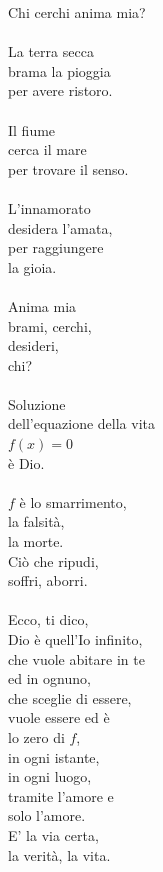 \begin{haiku}
Chi cerchi anima mia?\\

    \leavevmode\\

La terra secca\\
brama la pioggia\\
per avere ristoro.\\

\leavevmode\\

Il fiume\\
cerca il mare\\
per trovare il senso.\\

\leavevmode\\

L'innamorato\\
desidera l'amata,\\
per raggiungere\\
la gioia.\\

\leavevmode\\

Anima mia\\
brami, cerchi,\\
desideri,\\
chi?\\

\leavevmode\\

Soluzione\\
dell'equazione della vita\\
    \hspace{1cm}$f(x) = 0$\\
è Dio.\\

\leavevmode\\

$f$ è lo smarrimento,\\
la falsità,\\
la morte.\\
Ciò che ripudi,\\
soffri, aborri.\\

\leavevmode\\

Ecco, ti dico,\\
Dio è quell'Io infinito,\\
che vuole abitare in te\\
ed in ognuno,\\
che sceglie di essere,\\
vuole essere ed è\\
lo zero di $f$,\\
in ogni istante,\\
in ogni luogo,\\
tramite l'amore e\\
	solo l'amore.\\
E' la via certa,\\
la verità, la vita.\\


\end{haiku}
